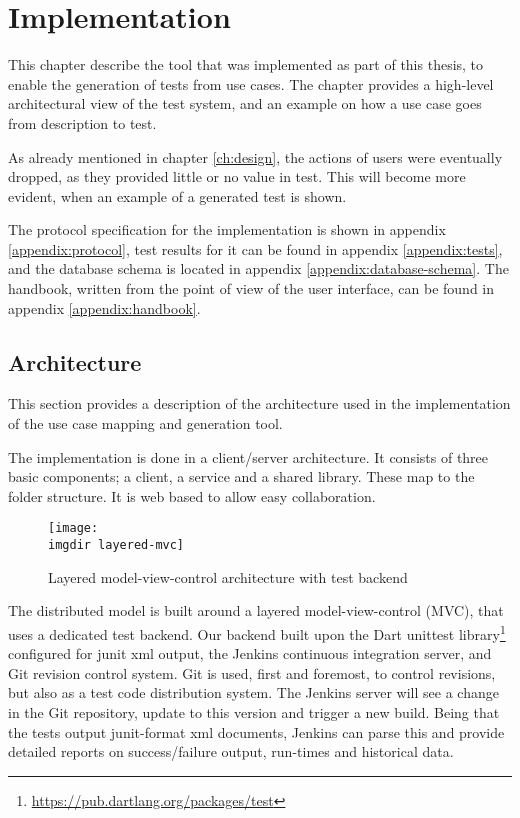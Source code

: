 \chapter{Implementation}
\label{chapter:implementation}
This chapter describe the tool that was implemented as part of this thesis, to enable the generation of tests from use cases. The chapter provides a high-level architectural view of the test system, and an example on how a use case goes from description to test.\medskip

\noindent As already mentioned in chapter \ref{ch:design}, the actions of users were eventually dropped, as they provided little or no value in test. This will become more evident, when an example of a generated test is shown.\medskip

\noindent The protocol specification for the implementation is shown in appendix \ref{appendix:protocol}, test results for it can be found in appendix \ref{appendix:tests}, and the database schema is located in appendix \ref{appendix:database-schema}. The handbook, written from the point of view of the user interface, can be found in appendix \ref{appendix:handbook}.

\section{Architecture}
This section provides a description of the architecture used in the implementation of the use case mapping and generation tool.\medskip

\noindent The implementation is done in a client/server architecture. It consists of three basic components; a client, a service and a shared library. These map to the folder structure. It is web based to allow easy collaboration.\medskip
\begin{figure}[!htbp]
  \centering
  \texttt{[image: \\imgdir layered-mvc]}
  \caption{Layered model-view-control architecture with test backend}
  \label{fig:layered-mvc}
\end{figure}
\noindent The distributed model is built around a layered model-view-control (MVC), that uses a dedicated test backend. Our backend built upon the Dart unittest library\footnote{\url{https://pub.dartlang.org/packages/test}} configured for junit xml output, the Jenkins continuous integration server, and Git revision control system. Git is used, first and foremost, to control revisions, but also as a test code distribution system. The Jenkins server will see a change in the Git repository, update to this version and trigger a new build. Being that the tests output junit-format xml documents, Jenkins can parse this and provide detailed reports on success/failure output, run-times and historical data.\medskip

